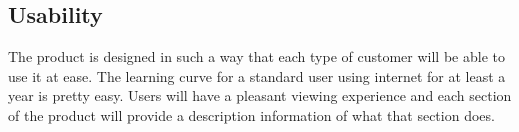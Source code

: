\documentclass[12pt]{report}
\begin{document}
\subsection{Usability}
The product is designed in such a way that each type of customer will be able to use it at ease. The learning curve for a standard user using internet for at least a year is pretty easy. Users will have a pleasant viewing experience and each section of the product will provide a description information of what that section does. 


\printindex
\end{document}
